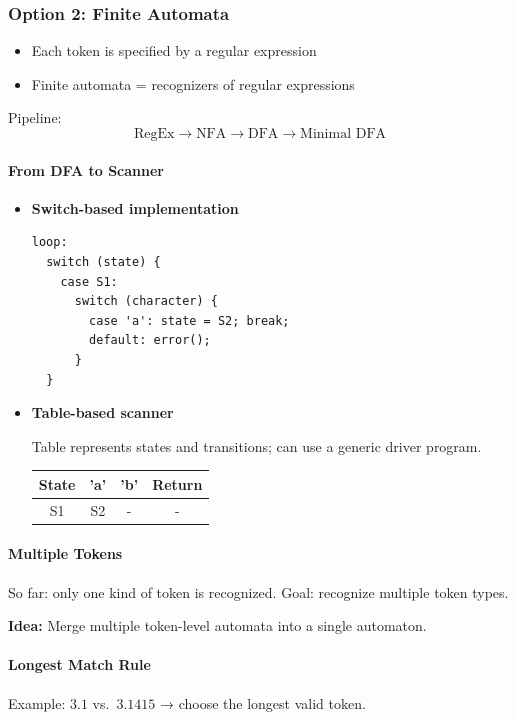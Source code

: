 \documentclass{article}
\begin{document}
\subsubsection{Option 2: Finite Automata}
\begin{itemize}
  \item Each token is specified by a regular expression
  \item Finite automata = recognizers of regular expressions
\end{itemize}

Pipeline:
\[
\text{RegEx} \rightarrow \text{NFA} \rightarrow \text{DFA} \rightarrow \text{Minimal DFA}
\]

\paragraph{From DFA to Scanner}

\begin{itemize}
  \item \textbf{Switch-based implementation}
  \begin{lstlisting}
loop:
  switch (state) {
    case S1:
      switch (character) {
        case 'a': state = S2; break;
        default: error();
      }
  }
  \end{lstlisting}

  \item \textbf{Table-based scanner}
  
  Table represents states and transitions; can use a generic driver program.

  \begin{center}
    \begin{tabular}{|c|c|c|c|}
      \hline 
      State & 'a' & 'b' & Return \\
      \hline
      S1 & S2 & - & - \\
      \hline
    \end{tabular}
  \end{center}
\end{itemize}

\paragraph{Multiple Tokens}
So far: only one kind of token is recognized.  
Goal: recognize multiple token types.

\textbf{Idea:} Merge multiple token-level automata into a single automaton.

\paragraph{Longest Match Rule}
Example: $3.1$ vs.\ $3.1415$ → choose the longest valid token.
\end{document}
